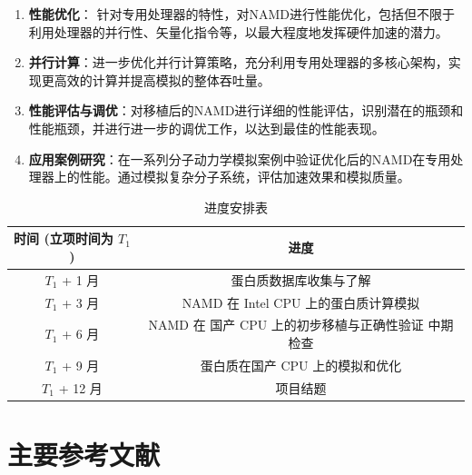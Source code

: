 \begin{enumerate}
    \item \textbf{性能优化}： 针对专用处理器的特性，对NAMD进行性能优化，包括但不限于利用处理器的并行性、矢量化指令等，以最大程度地发挥硬件加速的潜力。
    \item \textbf{并行计算}：进一步优化并行计算策略，充分利用专用处理器的多核心架构，实现更高效的计算并提高模拟的整体吞吐量。
    \item \textbf{性能评估与调优}：对移植后的NAMD进行详细的性能评估，识别潜在的瓶颈和性能瓶颈，并进行进一步的调优工作，以达到最佳的性能表现。
    \item \textbf{应用案例研究}：在一系列分子动力学模拟案例中验证优化后的NAMD在专用处理器上的性能。通过模拟复杂分子系统，评估加速效果和模拟质量。
\end{enumerate}


\begin{table}[h]
    \centering
    \caption{进度安排表}
    \label{tab:progress}
    \begin{tabular}{cc}
        \toprule
        时间 (立项时间为 $T_1$) & 进度                              \\
        \midrule
        $T_1$ + 1 月      & 蛋白质数据库收集与了解                     \\
        $T_1$ + 3 月      & NAMD 在 Intel CPU 上的蛋白质计算模拟      \\
        $T_1$ + 6 月      & NAMD 在 国产 CPU 上的初步移植与正确性验证 中期检查 \\
        $T_1$ + 9 月      & 蛋白质在国产 CPU 上的模拟和优化              \\
        $T_1$ + 12 月     & 项目结题                            \\
        \bottomrule
    \end{tabular}
\end{table}



\section{主要参考文献}



